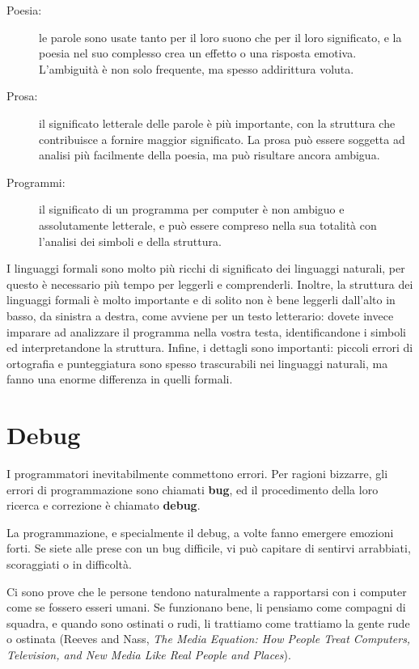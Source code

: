 \documentclass[10pt]{book}
\begin{document}
\begin{description}

\item[Poesia:] le parole sono usate tanto per il loro suono che per il loro     significato, e la poesia nel suo complesso crea un effetto o una risposta emotiva. L'ambiguità è non solo frequente, ma spesso addirittura voluta.

\item[Prosa:] il significato letterale delle parole è più importante, con la    struttura che contribuisce a fornire maggior significato. La prosa può essere soggetta ad analisi più facilmente della poesia, ma può risultare ancora ambigua.

\item[Programmi:] il significato di un programma per computer è non ambiguo e    assolutamente letterale, e può essere compreso nella sua totalità con l'analisi dei simboli e della struttura.

\end{description}

I linguaggi formali sono molto più ricchi di significato dei linguaggi naturali, per questo è necessario più tempo per leggerli e comprenderli. Inoltre, la struttura dei linguaggi formali è molto importante e di solito non è bene leggerli dall'alto in basso, da sinistra a destra, come avviene per un testo letterario: dovete invece imparare ad analizzare il programma nella vostra testa, identificandone i simboli ed interpretandone la struttura. Infine, i dettagli sono importanti: piccoli errori di ortografia e punteggiatura sono spesso trascurabili nei linguaggi naturali, ma fanno una enorme differenza in quelli formali.

\section{Debug}

I programmatori inevitabilmente commettono errori. Per ragioni bizzarre, gli errori di programmazione sono chiamati {\bf bug}, ed il procedimento della loro ricerca e correzione è chiamato {\bf debug}.

La programmazione, e specialmente il debug, a volte fanno emergere emozioni forti. Se siete alle prese con un bug difficile, vi può capitare di sentirvi arrabbiati, scoraggiati o in difficoltà.

Ci sono prove che le persone tendono naturalmente a rapportarsi con i computer come se fossero esseri umani. Se funzionano bene, li pensiamo come compagni di squadra, e quando sono ostinati o rudi, li trattiamo come trattiamo la gente rude o ostinata (Reeves and Nass, {\it The Media Equation: How People Treat Computers, Television, and New Media Like Real People and Places}).
\end{document}
